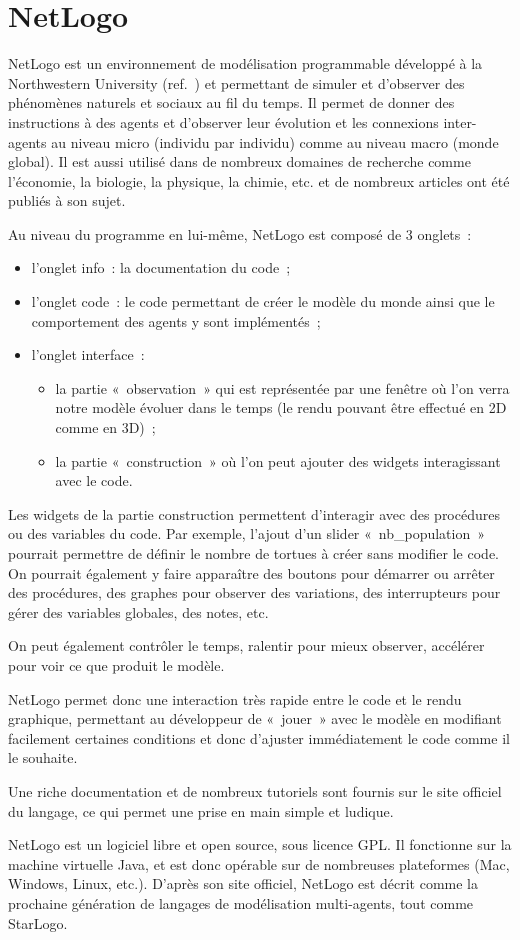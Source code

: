 \section{NetLogo}
\label{NetLogo}

NetLogo est un environnement de modélisation programmable développé à la Northwestern University (ref.~\cite{netlogo}) et permettant de simuler et d'observer des phénomènes naturels et sociaux au fil du temps. Il permet de donner des instructions à des agents et d'observer leur évolution et les connexions inter-agents au niveau micro (individu par individu) comme au niveau macro (monde global).
Il est aussi utilisé dans de nombreux domaines de recherche comme l'économie, la biologie, la physique, la chimie, etc. et de nombreux articles ont été publiés à son sujet.

Au niveau du programme en lui-même, NetLogo est composé de 3 onglets~:
\begin{itemize}
	\item l'onglet info~: la documentation du code~;
	\item l'onglet code~: le code permettant de créer le modèle du monde ainsi que le comportement des agents y sont implémentés~;
	\item l'onglet interface~:
          \begin{itemize}
          \item la partie «~observation~» qui est représentée par une fenêtre où l'on verra notre modèle évoluer dans le temps (le rendu pouvant être effectué en 2D comme en 3D)~;
          \item la partie «~construction~» où l'on peut ajouter des widgets interagissant avec le code.
          \end{itemize}
\end{itemize}

Les widgets de la partie construction permettent d'interagir avec des procédures ou des variables du code. Par exemple, l'ajout d'un slider «~nb\_population~» pourrait permettre de définir le nombre de tortues à créer sans modifier le code. On pourrait également y faire apparaître des boutons pour démarrer ou arrêter des procédures, des graphes pour observer des variations, des interrupteurs pour gérer des variables globales, des notes, etc.

On peut également contrôler le temps, ralentir pour mieux observer, accélérer pour voir ce que produit le modèle.

NetLogo permet donc une interaction très rapide entre le code et le rendu graphique, permettant au développeur de «~jouer~» avec le modèle en modifiant facilement certaines conditions et donc d'ajuster immédiatement le code comme il le souhaite.

Une riche documentation et de nombreux tutoriels sont fournis sur le site officiel du langage, ce qui permet une prise en main simple et ludique.

NetLogo est un logiciel libre et open source, sous licence GPL. Il fonctionne sur la machine virtuelle Java, et est donc opérable sur de nombreuses plateformes (Mac, Windows, Linux, etc.).
D'après son site officiel, NetLogo est décrit comme la prochaine génération de langages de modélisation multi-agents, tout comme StarLogo.
